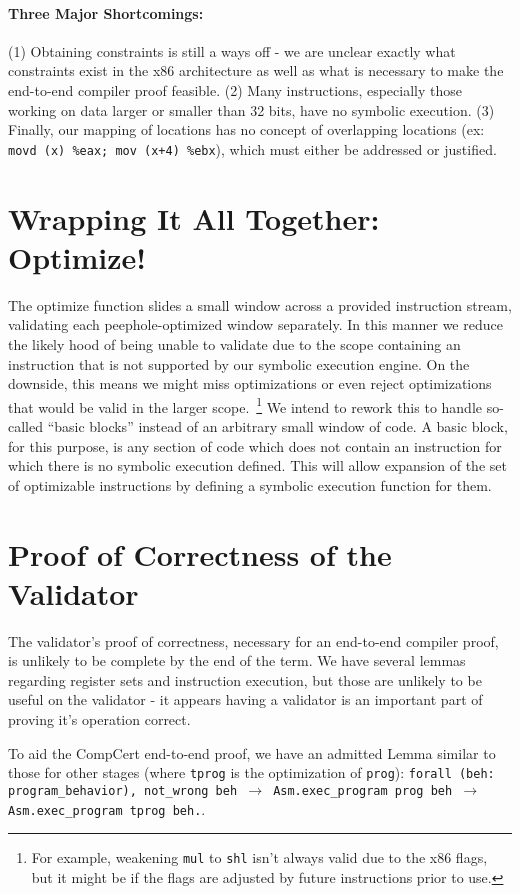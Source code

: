 \documentclass{article}
\begin{document}
\paragraph{Three Major Shortcomings: }
(1) Obtaining constraints is still a ways off - we are unclear exactly
what constraints exist in the x86 architecture as well as what is
necessary to make the end-to-end compiler proof feasible. (2) Many
instructions, especially those working on data larger or smaller than
32 bits, have no symbolic execution.  (3) Finally, our mapping of
locations has no concept of overlapping locations (ex: {\tt movd (x) \%eax;
mov (x+4) \%ebx}), which must either be addressed or justified.

\section{Wrapping It All Together: Optimize!}
The optimize function slides a small window across a provided
instruction stream, validating each peephole-optimized window
separately.  In this manner we reduce the likely hood of being unable
to validate due to the scope containing an instruction that is not
supported by our symbolic execution engine.  On the downside, this
means we might miss optimizations or even reject optimizations that
would be valid in the larger scope.~\footnote{For example, weakening
  {\tt mul} to {\tt shl} isn't always valid due to the x86 flags, but
  it might be if the flags are adjusted by future instructions prior
  to use.} We intend to rework this to handle so-called ``basic
blocks'' instead of an arbitrary small window of code. A basic block,
for this purpose, is any section of code which does not contain
an instruction for which there is no symbolic execution defined. This
will allow expansion of the set of optimizable instructions by
defining a symbolic execution function for them.

\section{Proof of Correctness of the Validator}
The validator's proof of correctness, necessary for an end-to-end
compiler proof, is unlikely to be complete by the end of the term.  We
have several lemmas regarding register sets and instruction execution,
but those are unlikely to be useful on the validator - it appears
having a validator is an important part of proving it's operation
correct.

To aid the CompCert end-to-end proof, we have an admitted Lemma
similar to those for other stages (where {\tt tprog} is the
optimization of {\tt prog}): {\tt forall (beh: program\_behavior),
  not\_wrong beh $\rightarrow$ Asm.exec\_program prog beh
  $\rightarrow$ Asm.exec\_program tprog beh.}.
\end{document}
